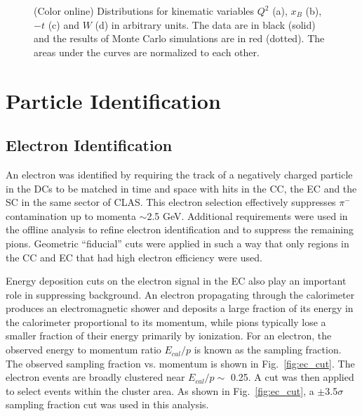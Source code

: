 \documentclass[prc,floatfix,twocolumn,superscriptaddress,letter]{revtex4}
\begin{document}
\begin{figure*}
\centering
{}
\caption{(Color online) Distributions for kinematic variables $Q^2$ (a), $x_B$ (b), $-t$ (c) and $W$ (d) in arbitrary units. 
The data are in black (solid) and the results of Monte Carlo simulations are in red (dotted). The areas under the curves are normalized to each other. }
\label{fig:kinvar}
\end{figure*}


\section{ Particle Identification}

\subsection{Electron Identification} 
An electron was identified by requiring the track of a negatively charged particle in the DCs to 
be matched in time and space with hits in 
the  CC,  the  EC and the SC
in the same sector of CLAS.
This electron selection effectively suppresses $\pi^{-}$ contamination up to momenta $\sim$2.5 GeV. 
Additional requirements were used in the offline analysis to refine electron identification and to suppress the  remaining pions.
 Geometric ``fiducial'' cuts were applied in such a way that only regions in the  CC  and EC that had high electron efficiency  were used.


Energy deposition cuts on the electron signal in the EC  also play an important role in suppressing background.
 An electron propagating through the  calorimeter produces an electromagnetic shower and deposits a large fraction of its energy in the calorimeter proportional to its momentum, while  pions typically lose a smaller fraction of their energy primarily   by ionization. 
For an electron, the observed energy to momentum ratio $E_{cal}/p$ is  known as the sampling fraction. The observed sampling fraction vs. momentum is shown in Fig.~\ref{fig:ec_cut}.
The  electron events are broadly clustered near $E_{cal}/p\sim$ 0.25. A cut was then applied to select events  within the cluster area. As shown in  Fig.~\ref{fig:ec_cut}, a $\pm$3.5$\sigma$ sampling fraction cut was  used in this analysis.
\end{document}
